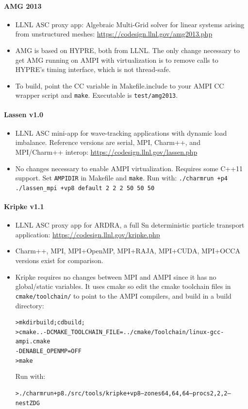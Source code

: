 \documentclass[10pt]{article}
\begin{document}
\paragraph{AMG 2013}
    \begin{itemize}
    \item
      LLNL ASC proxy app: Algebraic Multi-Grid solver for linear systems
      arising from unstructured
      meshes: \url{https://codesign.llnl.gov/amg2013.php}
    \item
      AMG is based on HYPRE, both from LLNL. The only change necessary
      to get AMG running on AMPI with virtualization is
      to remove calls to HYPRE's timing interface, which is not
      thread-safe.
    \item
      To build, point the CC variable in Makefile.include to your AMPI
      CC wrapper script and \texttt{make}. Executable is \texttt{test/amg2013}.
    \end{itemize}

\paragraph{Lassen v1.0}
    \begin{itemize}
    \item
      LLNL ASC mini-app for wave-tracking applications with dynamic load
      imbalance. Reference versions are serial, MPI, Charm++, and
      MPI/Charm++ interop: \url{https://codesign.llnl.gov/lassen.php}
    \item
      No changes necessary to enable AMPI virtualization. Requires some
      C++11 support. Set \texttt{AMPIDIR} in Makefile and \texttt{make}. Run with:
      \texttt{./charmrun +p4 ./lassen\_mpi +vp8 default 2 2 2 50 50 50}
    \end{itemize}

\paragraph{Kripke v1.1}
    \begin{itemize}
    \item
      LLNL ASC proxy app for ARDRA, a full Sn deterministic particle
      transport application: \url{https://codesign.llnl.gov/kripke.php}
    \item
      Charm++, MPI, MPI+OpenMP, MPI+RAJA, MPI+CUDA, MPI+OCCA versions
      exist for comparison.
    \item
      Kripke requires no changes between MPI and AMPI since it has no
      global/static variables. It uses
      cmake so edit the cmake toolchain files in \texttt{cmake/toolchain/} to
      point to the AMPI compilers, and build in a build directory:
\begin{alltt}
> mkdir build; cd build;
> cmake .. -DCMAKE_TOOLCHAIN\_FILE=../cmake/Toolchain/linux-gcc-ampi.cmake
-DENABLE_OPENMP=OFF
> make
\end{alltt}
Run with:
\begin{alltt}
> ./charmrun +p8 ./src/tools/kripke +vp8 --zones 64,64,64 --procs 2,2,2 --nest ZDG
\end{alltt}
    \end{itemize}
\end{document}
